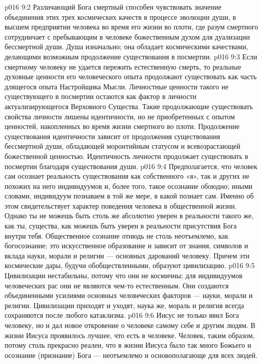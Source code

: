 \vs p016 9:2 Различающий Бога смертный способен чувствовать значение объединения этих трех космических качеств в процессе эволюции души, в высшем предприятии человека во время его жизни во плоти, где разум смертного сотрудничает с пребывающим в человеке божественным духом для дуализации бессмертной души. Душа  изначально; она обладает космическими качествами, делающими возможным продолжение существования в посмертии.
\vs p016 9:3 Если смертному человеку не удается пережить естественную смерть, то реальные духовные ценности его человеческого опыта продолжают существовать как часть длящегося опыта Настройщика Мысли. Личностные ценности такого не существующего в посмертии остаются как фактор в личности актуализирующегося Верховного Существа. Такие продолжающие существовать свойства личности лишены идентичности, но не приобретенных с опытом ценностей, накопленных во время жизни смертного во плоти. Продолжение существования идентичности зависит от продолжения существования бессмертной души, обладающей моронтийным статусом и всевозрастающей божественной ценностью. Идентичность личности продолжает существовать в посмертии благодаря существования души.
\vs p016 9:4 \pc Предполагается, что человек сам осознает реальность существования как собственного «я», так и других не похожих на него индивидуумов и, более того, такое осознание обоюдно; иными словами, индивидуум познаваем в той же мере, в какой познает сам. Именно об этом свидетельствует характер поведения человека в общественной жизни. Однако ты не можешь быть столь же абсолютно уверен в реальности такого же, как ты, существа, как можешь быть уверен в реальности присутствия Бога внутри тебя. Общественное сознание отнюдь не столь неотъемлемо, как богосознание; это искусственное образование и зависит от знания, символов и вклада науки, морали и религии --- основных дарований человеку. Причем эти космические дары, будучи обобществленными, образуют цивилизацию.
\vs p016 9:5 Цивилизации нестабильны, потому что они не космичны; для индивидуумов человеческих рас они не являются чем\hyp{}то естественным. Они создаются объединенными усилиями основных человеческих факторов --- науки, морали и религии. Цивилизации приходят и уходят, наука же, мораль и религия всегда сохраняются после любого катаклизма.
\vs p016 9:6 Иисус не только явил Бога человеку, но и дал новое откровение о человеке самому себе и другим людям. В жизни Иисуса проявилось лучшее, что есть в человеке. Человек, таким образом, потому столь прекрасно реален, что в жизни Иисуса было так много Божьего и осознание (признание) Бога --- неотъемлемо и основополагающе для всех людей.
